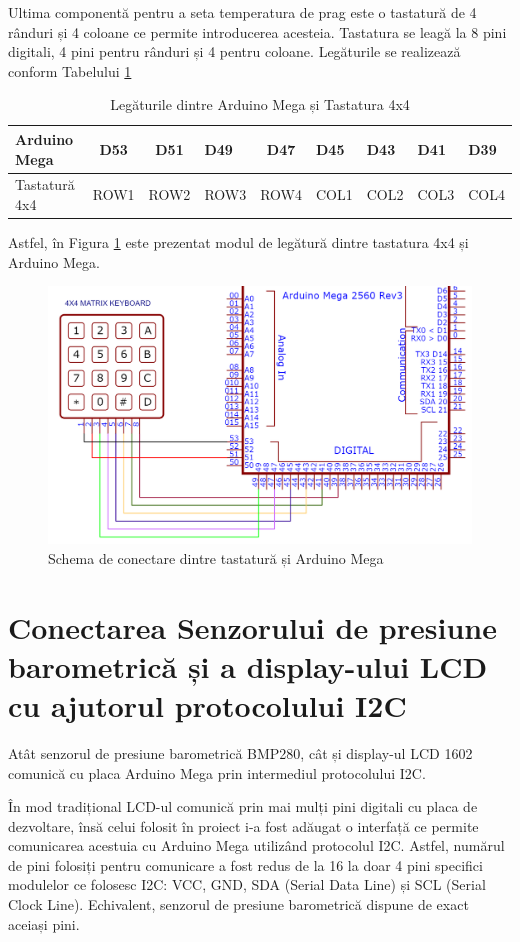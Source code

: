 Ultima componentă pentru a seta temperatura de prag este o tastatură de 4 rânduri și 4 coloane ce permite introducerea acesteia. Tastatura se leagă la 8 pini digitali, 4 pini pentru rânduri și 4 pentru coloane. Legăturile se realizează conform Tabelului \ref{tab:conexiune_tastaura}

\begin{table}[H]
\caption{Legăturile dintre Arduino Mega și Tastatura 4x4}
\label{tab:conexiune_tastaura}
\begin{tabular}{|l|c|c|l|c|l|l|l|l|}
\hline
Arduino Mega & D53 & D51 & D49 & D47 & D45 & D43 & D41 & D39 \\ \hline
Tastatură 4x4 & ROW1 & ROW2 & ROW3 & ROW4 & COL1 & COL2 & COL3 & COL4 \\ \hline
\end{tabular}
\end{table}

Astfel, în Figura \ref{fig:conexiune_tastatura} este prezentat modul de legătură dintre tastatura 4x4 și Arduino Mega.

\begin{figure}[H]
\includegraphics[width=0.5\linewidth]{bachelors_ro/images/conexiune_tastatura.png}
\caption{Schema de conectare dintre tastatură și Arduino Mega}
\label{fig:conexiune_tastatura}
\end{figure}

\section{Conectarea Senzorului de presiune barometrică și a display-ului LCD cu ajutorul protocolului I2C}
Atât senzorul de presiune barometrică BMP280, cât și display-ul LCD 1602 comunică cu placa Arduino Mega prin intermediul protocolului I2C.

În mod tradițional LCD-ul comunică prin mai mulți pini digitali cu placa de dezvoltare, însă celui folosit în proiect i-a fost adăugat o interfață ce permite comunicarea acestuia cu Arduino Mega utilizând protocolul I2C. Astfel, numărul de pini folosiți pentru comunicare a fost redus de la 16 la doar 4 pini specifici modulelor ce folosesc I2C: VCC, GND, SDA (Serial Data Line) și SCL (Serial Clock Line). Echivalent, senzorul de presiune barometrică dispune de exact aceiași pini.


